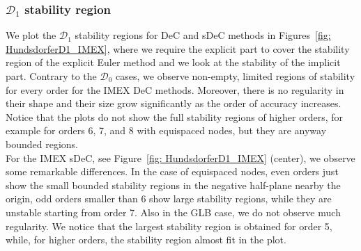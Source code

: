 \subsubsection*{$\mathcal{D}_1$ stability region}
We plot the $\mathcal{D}_1$ stability regions for DeC and sDeC methods in Figures~\ref{fig: HundsdorferD1_IMEX}, where we require the explicit part to cover the stability region of the explicit Euler method and we look at the stability of the implicit part. 
Contrary to the $\mathcal{D}_0$ cases, we observe non-empty, limited regions of stability for every order for the IMEX DeC methods. Moreover, there is no regularity in their shape and their size grow significantly as the order of accuracy increases.
Notice that the plots do not show the full stability regions of higher orders, for example for orders 6, 7, and 8 with equispaced nodes, but they are anyway bounded regions. \\
For the IMEX sDeC, see Figure~\ref{fig: HundsdorferD1_IMEX} (center), we observe some remarkable differences. In the case of equispaced nodes, even orders just show the small bounded stability regions in the negative half-plane nearby the origin, odd orders smaller than 6 show large stability regions, while they are unstable starting from order 7. 
Also in the GLB case, we do not observe much regularity. 
We notice that the largest stability region is obtained for order 5, while, for higher orders, the stability region almost fit in the plot.
